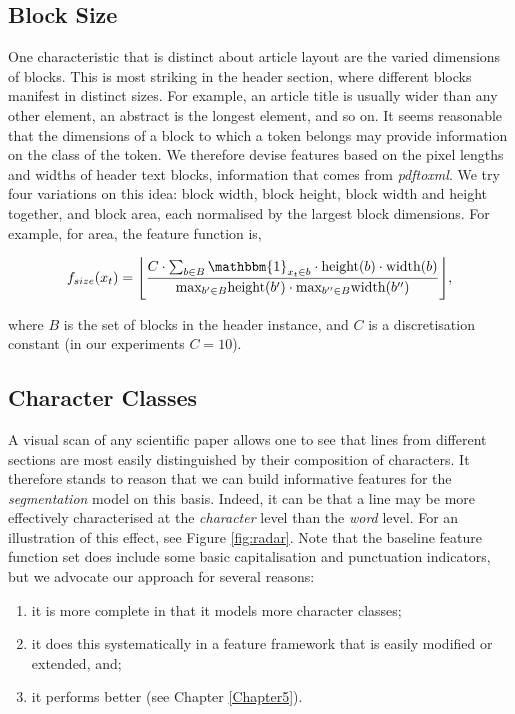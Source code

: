 \subsection{Block Size}

One characteristic that is distinct about article layout are the varied dimensions of blocks. This is most striking in the header section, where different blocks manifest in distinct sizes. For example, an article title is usually wider than any other element, an abstract is the longest element, and so on. It seems reasonable that the dimensions of a block to which a token belongs may provide information on the class of the token. We therefore devise features based on the pixel lengths and widths of header text blocks, information that comes from \emph{pdftoxml}. We try four variations on this idea: block width, block height, block width and height together, and block area, each normalised by the largest block dimensions. For example, for area, the feature function is,

\begin{equation}
f_{size}(x_t) =  \Bigg\lfloor\frac{C \cdot \sum_{b \in B} \mathbbm{1}_{x_t \in b} \cdot\text{height}(b)\cdot\text{width}(b)}{\text{max}_{b' \in B} \text{height}(b') \cdot \text{max}_{b'' \in B} \text{width}(b'')} \Bigg\rfloor,
\label{eq:areafunction}
\end{equation}

where $B$ is the set of blocks in the header instance, and $C$ is a discretisation constant (in our experiments $C = 10$).

\subsection{Character Classes}
\label{subsec:characterclasses}
A visual scan of any scientific paper allows one to see that lines from different sections are most easily distinguished by their composition of characters. It therefore stands to reason that we can build informative features for the \emph{segmentation} model on this basis. Indeed, it can be that a line may be more effectively characterised at the \emph{character} level than the \emph{word} level. For an illustration of this effect, see Figure \ref{fig:radar}. Note that the baseline feature function set does include some basic capitalisation and punctuation indicators, but we advocate our approach for several reasons:

\begin{enumerate}
\item it is more complete in that it models more character classes;
\item it does this systematically in a feature framework that is easily modified or extended, and;
\item it performs better (see Chapter \ref{Chapter5}).
\end{enumerate}

